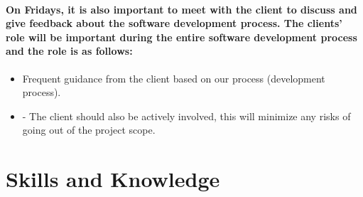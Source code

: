 \documentclass{article}
\begin{document}
\paragraph{On Fridays, it is also important to meet with the client to discuss and give feedback about the software development process. The clients’ role will be important during the entire software development process and the role is as follows:}

\begin{itemize}
\item Frequent guidance from the client based on our process (development process).
\item -	The client should also be actively involved, this will minimize any risks of going out of the project scope.
\end{itemize}

\section{Skills and Knowledge}
\end{document}
